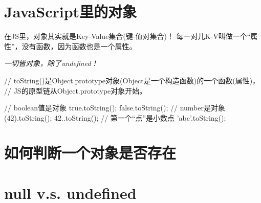 ﻿\section[JavaScript里的对象]{JavaScript里的对象}
在JS里，对象其实就是Key-Value集合(键-值对集合)！
每一对儿K-V叫做一个“属性”，没有函数，因为函数也是一个属性。

\emph{一切皆对象，除了undefined！}

\begin{javascriptcode}
// toString()是Object.prototype对象(Object是一个构造函数)的一个函数(属性)，
// JS的原型链从Object.prototype对象开始。

// boolean值是对象
true.toString();
false.toString();
// number是对象
(42).toString();
42..toString(); // 第一个“点”是小数点
'abc'.toString();
\end{javascriptcode}


\section[如何判断一个对象是否存在]{如何判断一个对象是否存在}

\section[null v.s. undefined]{null v.s. undefined}
